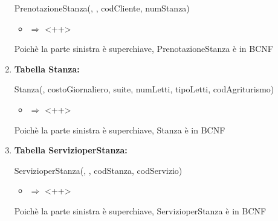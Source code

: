 \documentclass[12pt,a4paper]{article}
\begin{document}
\begin{enumerate}
PrenotazioneStanza(\underline{}, \underline{},  codCliente,  numStanza)
\begin{itemize}
\vspace{-5pt}
\item <++> $\Rightarrow$ <++>
\vspace{-5pt}
\end{itemize}
Poichè la parte sinistra è superchiave, PrenotazioneStanza è in BCNF
\vspace{10pt}



\item[] \textbf{Tabella Stanza:}

Stanza(\underline{}, costoGiornaliero, suite, numLetti, tipoLetti,  codAgriturismo)
\begin{itemize}
\vspace{-5pt}
\item <++> $\Rightarrow$ <++>
\vspace{-5pt}
\end{itemize}
Poichè la parte sinistra è superchiave, Stanza è in BCNF
\vspace{10pt}



\item[] \textbf{Tabella ServizioperStanza:}

ServizioperStanza(\underline{}, \underline{},  codStanza,  codServizio)
\begin{itemize}
\vspace{-5pt}
\item <++> $\Rightarrow$ <++>
\vspace{-5pt}
\end{itemize}
Poichè la parte sinistra è superchiave, ServizioperStanza è in BCNF
\vspace{10pt}




\end{enumerate}
\end{document}

